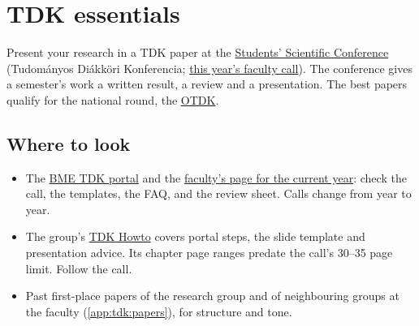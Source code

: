 \chapter{TDK essentials}\label{app:tdk}
Present your research in a TDK paper at the \href{https://tdk.bme.hu/}{Students' Scientific Conference} (Tudományos Diákköri Konferencia; \href{https://tdk.bme.hu/conference/VIK/2026}{this year's faculty call}). The conference gives a semester's work a written result, a review and a presentation. The best papers qualify for the national round, the \href{https://otdk.hu/}{OTDK}.

\section{Where to look}
\begin{itemize}
  \item The \href{https://tdk.bme.hu/}{BME TDK portal} and the \href{https://tdk.bme.hu/conference/VIK/2026}{faculty's page for the current year}: check the call, the templates, the FAQ, and the review sheet. Calls change from year to year.
  \item The group's \href{https://github.com/ftsrg/cheat-sheets/wiki/TDK-Howto}{TDK Howto} covers portal steps, the slide template and presentation advice. Its chapter page ranges predate the call's 30--35 page limit. Follow the call.
  \item Past first-place papers of the research group and of neighbouring groups at the faculty (\cref{app:tdk:papers}), for structure and tone.
\end{itemize}


